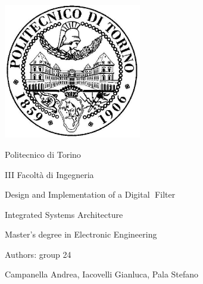 \documentclass[11pt,  english, makeidx, a4paper, titlepage, oneside]{book}
\begin{document}
\frontmatter
\begin{titlepage}
\vspace{2cm}
\centerline{
\includegraphics[width=6cm]{./logopoli}}
\bigskip
\centerline{\LARGE Politecnico di Torino}
\bigskip
\centerline{\Large III Facolt\`a di Ingegneria}
\vspace{4cm}
\centerline{\Huge\sf Design and Implementation of a Digital Filter}
\bigskip
\centerline{\Huge\sf Integrated Systems Architecture}
\vspace{2cm}
\centerline{\LARGE Master's degree in Electronic Engineering}
\vspace{3cm}
%
\centerline{\Large Authors: group 24}
\vspace{2cm}
%
%
\centerline{\large Campanella Andrea, Iacovelli Gianluca, Pala Stefano}

%
\end{titlepage}

\tableofcontents

% 
\mainmatter
\lstset{language=VHDL}


\end{document}

